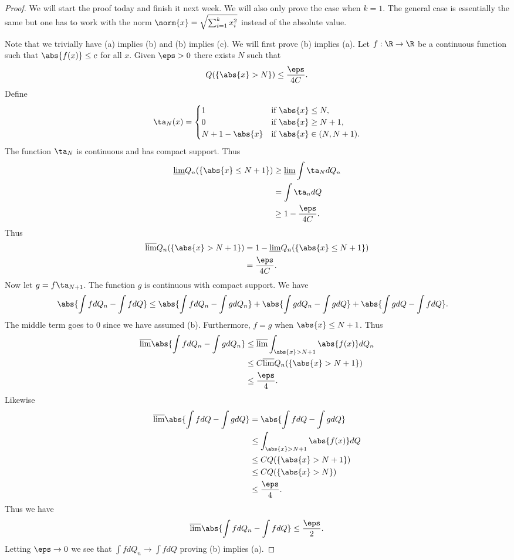 \begin{proof}
    We will start the proof today and finish it next week. We will also only prove the case when $k=1$. The general case is essentially the same but one has to work with the norm $\norm{x}=\sqrt{\sum_{i=1}^k x_i^2}$ instead of the absolute value.
    
    Note that we trivially have (a) implies (b) and (b) implies (c). We will first prove (b) implies (a). Let $f:\R \to \R$ be a continuous function such that $\abs{f(x)} \le c$ for all $x$. Given $\eps >0$ there exists $N$ such that 
    \[Q(\{\abs{x}> N\}) \le \frac{\eps}{4C}. \]
    Define \[\ta_N(x) = \begin{cases}
        1 & \text{if } \abs{x} \le N,\\
        0 & \text{if } \abs{x} \ge N+1,\\
        N+1-\abs{x} &\text{if } \abs{x} \in (N,N+1).
    \end{cases}\] 
    The function $\ta_N$ is continuous and has compact support. Thus
    \begin{align*}
        \underline{\lim}Q_n(\{\abs{x} \le N+1\}) &\ge \underline{\lim}\int \ta_N dQ_n\\
        &= \int \ta_n dQ\\
        &\ge 1-\frac{\eps}{4C}.
    \end{align*}
    Thus
    \begin{align*}
        \overline{\lim}Q_n(\{\abs{x}>N+1\})&=1-\underline{\lim}Q_n(\{\abs{x}\le N+1\})\\
        &= \frac{\eps}{4C}.
    \end{align*}
    Now let $g=f\ta_{N+1}$. The function $g$ is continuous with compact support. We have 
    \begin{align*}
        \abs{\int f dQ_n - \int f dQ} &\le \abs{\int f dQ_n - \int g dQ_n} + \abs{\int g dQ_n - \int g dQ}+\abs{\int g dQ-\int fdQ}.
    \end{align*}
    The middle term goes to 0 since we have assumed (b). Furthermore, $f=g$ when $\abs{x} \le N+1$. Thus
    \begin{align*}
        \overline{\lim} \abs{\int f dQ_n - \int g dQ_n} &\le\overline{\lim}\int_{\abs{x} > N+1} \abs{f(x)} dQ_n\\
        &\le C\overline{\lim} Q_n(\{\abs{x}>N+1\})\\
        &\le \frac{\eps}{4}.
    \end{align*}
    Likewise 
    \begin{align*}
        \overline{\lim} \abs{\int f dQ - \int g dQ} &= \abs{\int f dQ - \int g dQ}\\
        &\le\int_{\abs{x} > N+1} \abs{f(x)} dQ\\
        &\le C Q(\{\abs{x}>N+1\})\\
        &\le C Q(\{\abs{x}>N\})\\
        &\le \frac{\eps}{4}.
    \end{align*}
    Thus we have 
    \begin{align*}
        \overline{\lim}\abs{\int f dQ_n - \int f dQ}\le \frac{\eps}{2}.
    \end{align*}
    Letting $\eps \to 0$ we see that $\int f dQ_n \to \int f dQ$ proving (b) implies (a).


\end{proof}
